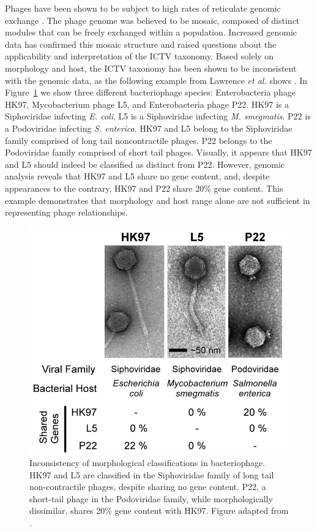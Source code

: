 Phages have been shown to be subject to high rates of reticulate genomic exchange \cite{Westmoreland:1969dd}.
The phage genome was believed to be mosaic, composed of distinct modules that can be freely exchanged within a population.
Increased genomic data has confirmed this mosaic structure and raised questions about the applicability and interpretation of the ICTV taxonomy.
Based solely on morphology and host, the ICTV taxonomy has been shown to be inconsistent with the genomic data, as the following example from Lawrence \emph{et al.} shows \cite{Lawrence:2002eg}.
In Figure~\ref{phage:fig:inconsistency} we show three different bacteriophage species: Enterobacteria phage HK97, Mycobacterium phage L5, and Enterobacteria phage P22.
HK97 is a Siphoviridae infecting \emph{E. coli}.
L5 is a Siphoviridae infecting \emph{M. smegmatis}.
P22 is a Podoviridae infecting \emph{S. enterica}.
HK97 and L5 belong to the Siphoviridae family comprised of long tail noncontractile phages.
P22 belongs to the Podoviridae family comprised of short tail phages.
Visually, it appears that HK97 and L5 should indeed be classified as distinct from P22.
However, genomic analysis reveals that HK97 and L5 share no gene content, and, despite appearances to the contrary, HK97 and P22 share 20\% gene content.
This example demonstrates that morphology and host range alone are not sufficient in representing phage relationships.

\begin{figure}
\centering
\includegraphics[width=.5\linewidth]{./fig/phage/LAWRENCE_phage_comparative.png}
\caption[Inconsistency of morphological classifications in bacteriophage]{Inconsistency of morphological classifications in bacteriophage. HK97 and L5 are classified in the Siphoviridae family of long tail non-contractile phages, despite sharing no gene content. P22, a short-tail phage in the Podoviridae family, while morphologically dissimilar, shares 20\% gene content with HK97. Figure adapted from \parencite{Lawrence:2002eg}.}
\label{phage:fig:inconsistency}
\end{figure}

